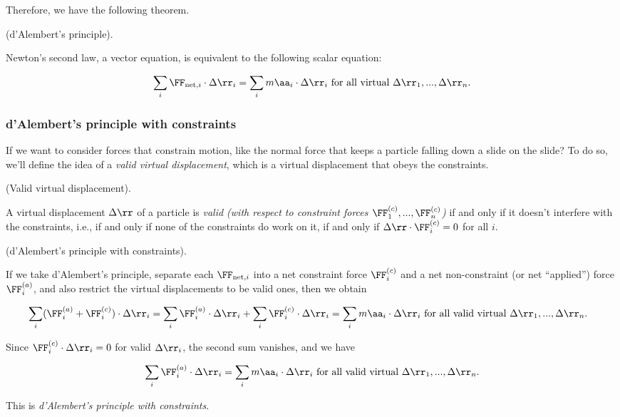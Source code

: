 \documentclass{article}
\begin{document}
Therefore, we have the following theorem.

\begin{theorem}
    (d'Alembert's principle).

    Newton's second law, a vector equation, is equivalent to the following scalar equation:

    \begin{align*}
        \sum_i \FF_{\text{net},i} \cdot \Delta \rr_i = \sum_i m\aa_i \cdot \Delta \rr_i \text{ for all virtual $\Delta \rr_1, ..., \Delta \rr_n$}.
    \end{align*}
\end{theorem}

\subsubsection*{d'Alembert's principle with constraints}

If we want to consider forces that constrain motion, like the normal force that keeps a particle falling down a slide on the slide? To do so, we'll define the idea of a \textit{valid virtual displacement}, which is a virtual displacement that obeys the constraints.

\begin{defn}
    (Valid virtual displacement).

    A virtual displacement $\Delta \rr$ of a particle is \textit{valid (with respect to constraint forces $\FF^{(c)}_1, ..., \FF^{(c)}_n$)} if and only if it doesn't interfere with the constraints, i.e., if and only if none of the constraints do work on it, if and only if  $\Delta \rr \cdot \FF^{(c)}_i = 0$ for all $i$.
\end{defn}

\begin{deriv}
    (d'Alembert's principle with constraints).

    If we take d'Alembert's principle, separate each $\FF_{\text{net}, i}$ into a net constraint force $\FF^{(c)}_i$ and a net non-constraint (or net ``applied'') force $\FF^{(a)}_i$, and also restrict the virtual displacements to be valid ones, then we obtain

    \begin{align*}
        &\sum_i (\FF^{(a)}_i + \FF^{(c)}_i) \cdot \Delta \rr_i = \sum_i \FF^{(a)}_i \cdot \Delta \rr_i + \sum_i \FF^{(c)}_i \cdot \Delta \rr_i = \sum_i m \aa_i \cdot \Delta \rr_i \text{ for all valid virtual $\Delta \rr_1, ..., \Delta \rr_n$}.
    \end{align*}
    
    Since $\FF^{(c)}_i \cdot \Delta \rr_i = 0$ for valid $\Delta \rr_i$, the second sum vanishes, and we have
    
    \begin{align*}
        \sum_i \FF^{(a)}_i \cdot \Delta \rr_i = \sum_i m \aa_i \cdot \Delta \rr_i \text{ for all valid virtual $\Delta \rr_1, ..., \Delta \rr_n$}.
    \end{align*}

    This is \textit{d'Alembert's principle with constraints}.
\end{deriv}
\end{document}
